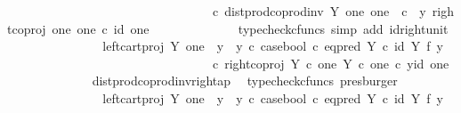 \begin{isabellebody}
\ \ \ \ \ \ \ \ \ \ \ \ \ \ \ \ \ \ \ \ \ \ \ \ \ \ \ \ \ \ \ \ \ {\isasymcirc}\isactrlsub c\ dist{\isacharunderscore}{\kern0pt}prod{\isacharunderscore}{\kern0pt}coprod{\isacharunderscore}{\kern0pt}inv\ Y\ one\ one\ \ {\isasymcirc}\isactrlsub c\ \ {\isasymlangle}y{}{\isacharcomma}{\kern0pt}\ right{\isacharunderscore}{\kern0pt}coproj\ one\ one\ {\isasymcirc}\isactrlsub c\ id\ one{\isasymrangle}{\isachardoublequoteclose}\isanewline
\ \ \ \ \ \ \ \ \ \ \ \ \isamarkupfalse%
\ {\isacharparenleft}{\kern0pt}typecheck{\isacharunderscore}{\kern0pt}cfuncs{\isacharcomma}{\kern0pt}\ simp\ add{\isacharcolon}{\kern0pt}\ id{\isacharunderscore}{\kern0pt}right{\isacharunderscore}{\kern0pt}unit{}{\isacharparenright}{\kern0pt}\isanewline
\ \ \ \ \ \ \ \ \ \ \isamarkupfalse%
\ \isamarkupfalse%
\ {\isachardoublequoteopen}{\isachardot}{\kern0pt}{\isachardot}{\kern0pt}{\isachardot}{\kern0pt}\ {\isacharequal}{\kern0pt}\ {\isacharparenleft}{\kern0pt}left{\isacharunderscore}{\kern0pt}cart{\isacharunderscore}{\kern0pt}proj\ Y\ one\ {\isasymamalg}\ {\isacharparenleft}{\kern0pt}{\isacharparenleft}{\kern0pt}y{}\ {\isasymamalg}\ y{}{\isacharparenright}{\kern0pt}\ {\isasymcirc}\isactrlsub c\ case{\isacharunderscore}{\kern0pt}bool\ {\isasymcirc}\isactrlsub c\ eq{\isacharunderscore}{\kern0pt}pred\ Y\ {\isasymcirc}\isactrlsub c\ {\isacharparenleft}{\kern0pt}id\ Y\ {\isasymtimes}\isactrlsub f\ y{}{\isacharparenright}{\kern0pt}{\isacharparenright}{\kern0pt}{\isacharparenright}{\kern0pt}\isanewline
\ \ \ \ \ \ \ \ \ \ \ \ \ \ \ \ \ \ \ \ \ \ \ \ \ \ \ \ \ \ \ \ \ {\isasymcirc}\isactrlsub c\ right{\isacharunderscore}{\kern0pt}coproj\ {\isacharparenleft}{\kern0pt}Y\ {\isasymtimes}\isactrlsub c\ one{\isacharparenright}{\kern0pt}\ {\isacharparenleft}{\kern0pt}Y\ {\isasymtimes}\isactrlsub c\ one{\isacharparenright}{\kern0pt}\ {\isasymcirc}\isactrlsub c\ {\isasymlangle}y{}{\isacharcomma}{\kern0pt}id\ one{\isasymrangle}{\isachardoublequoteclose}\isanewline
\ \ \ \ \ \ \ \ \ \ \ \ \isamarkupfalse%
\ dist{\isacharunderscore}{\kern0pt}prod{\isacharunderscore}{\kern0pt}coprod{\isacharunderscore}{\kern0pt}inv{\isacharunderscore}{\kern0pt}right{\isacharunderscore}{\kern0pt}ap\ \isamarkupfalse%
\ {\isacharparenleft}{\kern0pt}typecheck{\isacharunderscore}{\kern0pt}cfuncs{\isacharcomma}{\kern0pt}\ presburger{\isacharparenright}{\kern0pt}\isanewline
\ \ \ \ \ \ \ \ \ \ \isamarkupfalse%
\ \isamarkupfalse%
\ {\isachardoublequoteopen}{\isachardot}{\kern0pt}{\isachardot}{\kern0pt}{\isachardot}{\kern0pt}\ {\isacharequal}{\kern0pt}\ {\isacharparenleft}{\kern0pt}{\isacharparenleft}{\kern0pt}left{\isacharunderscore}{\kern0pt}cart{\isacharunderscore}{\kern0pt}proj\ Y\ one\ {\isasymamalg}\ {\isacharparenleft}{\kern0pt}{\isacharparenleft}{\kern0pt}y{}\ {\isasymamalg}\ y{}{\isacharparenright}{\kern0pt}\ {\isasymcirc}\isactrlsub c\ case{\isacharunderscore}{\kern0pt}bool\ {\isasymcirc}\isactrlsub c\ eq{\isacharunderscore}{\kern0pt}pred\ Y\ {\isasymcirc}\isactrlsub c\ {\isacharparenleft}{\kern0pt}id\ Y\ {\isasymtimes}\isactrlsub f\ y{}{\isacharparenright}{\kern0pt}{\isacharparenright}{\kern0pt}{\isacharparenright}{\kern0pt}\ \isanewline

\end{isabellebody}
